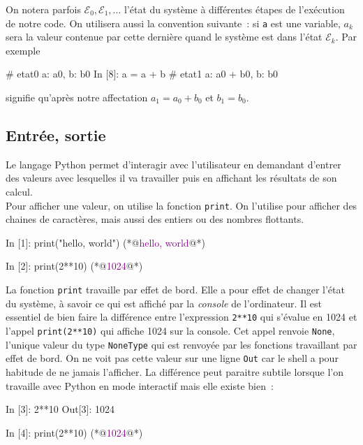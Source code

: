 \documentclass{magnolia}
\begin{document}
On notera parfois $\mathcal{E}_0, \mathcal{E}_1, \dots$ l'état du système à
différentes étapes de l'exécution de notre code. On utilisera aussi la convention
suivante~: si \verb_a_ est une variable, $a_k$ sera la valeur contenue par cette dernière
quand le système est dans l'état $\mathcal{E}_k$. Par exemple

\begin{pythoncode}
# etat0 {a: a0, b: b0}
In [8]: a = a + b
# etat1 {a: a0 + b0, b: b0} 
\end{pythoncode}

\noindent signifie qu'après notre affectation $a_1=a_0+b_0$ et $b_1=b_0$.


\subsection{Entrée, sortie}

Le langage Python permet d'interagir avec l'utilisateur en demandant d'entrer des valeurs avec lesquelles il va travailler puis en affichant les résultats de son calcul.\\

Pour afficher une valeur, on utilise la fonction \verb_print_. On l'utilise pour afficher des chaines de caractères, mais aussi des entiers ou des nombres flottants.


\begin{pythoncode}
In [1]: print("hello, world")
(*@\textcolor{purple}{hello, world}@*)

In [2]: print(2**10)
(*@\textcolor{purple}{1024}@*)
\end{pythoncode}


\noindent La fonction \verb_print_ travaille par effet de bord. Elle a pour effet de
changer l'état du système, à savoir ce qui est affiché par la \emph{console} de l'ordinateur.
Il est essentiel de bien faire la différence entre l'expression \verb_2**10_ qui s'évalue en
1024 et l'appel \verb_print(2**10)_ qui affiche 1024 sur la console. Cet appel 
renvoie \verb_None_, l'unique valeur du type \verb_NoneType_ qui est renvoyée par les 
fonctions travaillant par effet de bord. On ne voit pas cette valeur sur une ligne \verb!Out! car le shell a pour habitude de ne jamais l'afficher. La différence peut paraitre subtile lorsque l'on 
travaille avec Python en mode interactif mais elle existe bien~:
\begin{pythoncode}
In [3]: 2**10
Out[3]: 1024

In [4]: print(2**10)
(*@\textcolor{purple}{1024}@*)
\end{pythoncode}
\end{document}
